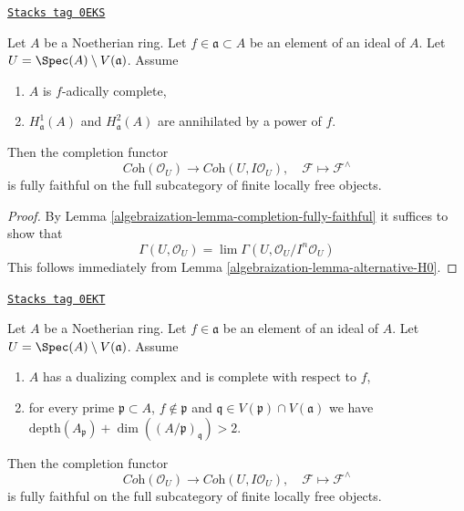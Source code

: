 \begin{lemma}
\label{algebraization-lemma-fully-faithful-alternative}
\href{https://stacks.math.columbia.edu/tag/0EKS}{\texttt{Stacks tag 0EKS}}

Let $A$ be a Noetherian ring. Let $f \in \mathfrak a \subset A$
be an element of an ideal of $A$. Let $U = \Spec(A) \setminus V(\mathfrak a)$.
Assume
\begin{enumerate}
\item $A$ is $f$-adically complete,
\item $H^1_\mathfrak a(A)$ and $H^2_\mathfrak a(A)$ are
annihilated by a power of $f$.
\end{enumerate}
Then the completion functor
$$
\textit{Coh}(\mathcal{O}_U)
\longrightarrow
\textit{Coh}(U, I\mathcal{O}_U),
\quad
\mathcal{F} \longmapsto \mathcal{F}^\wedge
$$
is fully faithful on the full subcategory of
finite locally free objects.
\end{lemma}

\begin{proof}

By Lemma \ref{algebraization-lemma-completion-fully-faithful}
it suffices to show that
$$
\Gamma(U, \mathcal{O}_U) =
\lim \Gamma(U, \mathcal{O}_U/I^n\mathcal{O}_U)
$$
This follows immediately from
Lemma \ref{algebraization-lemma-alternative-H0}.
\end{proof}

\begin{lemma}
\label{algebraization-lemma-fully-faithful-simple-two}
\href{https://stacks.math.columbia.edu/tag/0EKT}{\texttt{Stacks tag 0EKT}}

Let $A$ be a Noetherian ring. Let $f \in \mathfrak a$ be an element of
an ideal of $A$. Let $U = \Spec(A) \setminus V(\mathfrak a)$. Assume
\begin{enumerate}
\item $A$ has a dualizing complex and is complete with respect to $f$,
\item for every prime $\mathfrak p \subset A$, $f \not \in \mathfrak p$
and $\mathfrak q \in V(\mathfrak p) \cap V(\mathfrak a)$ we have
$\text{depth}(A_\mathfrak p) + \dim((A/\mathfrak p)_\mathfrak q) > 2$.
\end{enumerate}
Then the completion functor
$$
\textit{Coh}(\mathcal{O}_U)
\longrightarrow
\textit{Coh}(U, I\mathcal{O}_U),
\quad
\mathcal{F} \longmapsto \mathcal{F}^\wedge
$$
is fully faithful on the full subcategory of finite locally free objects.
\end{lemma}

